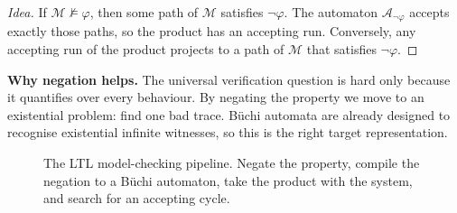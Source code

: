 \begin{proof}[Idea]
If $\mathcal{M} \not\models \varphi$, then some path of $\mathcal{M}$
satisfies $\neg\varphi$.  The automaton $\mathcal{A}_{\neg\varphi}$ accepts
exactly those paths, so the product has an accepting run.  Conversely, any
accepting run of the product projects to a path of $\mathcal{M}$ that
satisfies $\neg\varphi$.
\end{proof}

\medskip\noindent
\textbf{Why negation helps.}  The universal verification question is hard
only because it quantifies over every behaviour.  By negating the property we
move to an existential problem: find one bad trace.  B\"uchi automata are
already designed to recognise existential infinite witnesses, so this is the
right target representation.

\begin{figure}[ht]
  \centering
  \caption{The LTL model-checking pipeline.  Negate the property, compile
           the negation to a B\"uchi automaton, take the product with the
           system, and search for an accepting cycle.}
  \label{fig:ltl-mc-pipeline}
\end{figure}

